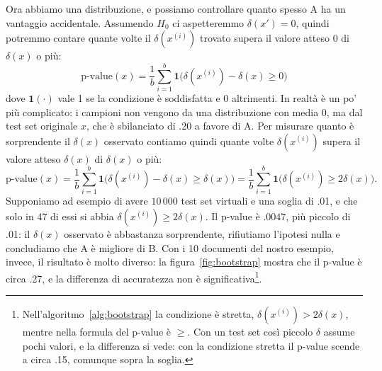 Ora abbiamo una distribuzione, e possiamo controllare quanto spesso A ha un vantaggio accidentale. Assumendo $H_0$ ci aspetteremmo $\delta(x') = 0$, quindi potremmo contare quante volte il $\delta(x^{(i)})$ trovato supera il valore atteso 0 di $\delta(x)$ o più:
\begin{equation}
\text{p-value}(x) = \frac{1}{b} \sum_{i=1}^{b} \mathbf{1}\big(\delta(x^{(i)}) - \delta(x) \geq 0\big)
\end{equation}
dove $\mathbf{1}(\cdot)$ vale 1 se la condizione è soddisfatta e 0 altrimenti. In realtà è un po' più complicato: i campioni non vengono da una distribuzione con media 0, ma dal test set originale $x$, che è sbilanciato di .20 a favore di A. Per misurare quanto è sorprendente il $\delta(x)$ osservato contiamo quindi quante volte $\delta(x^{(i)})$ supera il valore atteso $\delta(x)$ di $\delta(x)$ o più:
\begin{equation}
\text{p-value}(x) = \frac{1}{b} \sum_{i=1}^{b} \mathbf{1}\big(\delta(x^{(i)}) - \delta(x) \geq \delta(x)\big) = \frac{1}{b} \sum_{i=1}^{b} \mathbf{1}\big(\delta(x^{(i)}) \geq 2\delta(x)\big).
\end{equation}
Supponiamo ad esempio di avere $10\,000$ test set virtuali e una soglia di .01, e che solo in 47 di essi si abbia $\delta(x^{(i)}) \geq 2\delta(x)$. Il p-value è $.0047$, più piccolo di .01: il $\delta(x)$ osservato è abbastanza sorprendente, rifiutiamo l'ipotesi nulla e concludiamo che A è migliore di B. Con i 10 documenti del nostro esempio, invece, il risultato è molto diverso: la figura~\ref{fig:bootstrap} mostra che il p-value è circa .27, e la differenza di accuratezza non è significativa\footnote{Nell'algoritmo~\ref{alg:bootstrap} la condizione è stretta, $\delta(x^{(i)}) > 2\delta(x)$, mentre nella formula del p-value è $\geq$. Con un test set così piccolo $\delta$ assume pochi valori, e la differenza si vede: con la condizione stretta il p-value scende a circa .15, comunque sopra la soglia.}.

